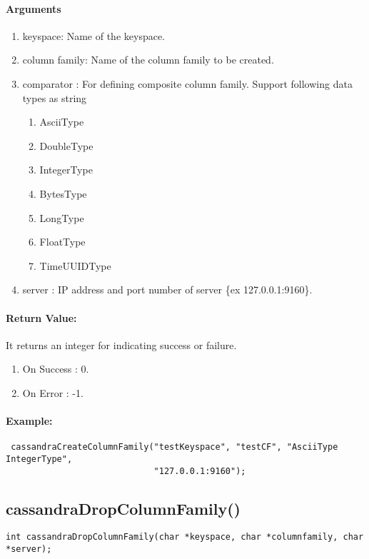 \documentclass[12 pt , a4paper ]{report}
\begin{document}
  \paragraph{Arguments}
  \begin{enumerate}
   \item keyspace: Name of the keyspace.
   \item column family: Name of the column family to be created.
   \item comparator : For defining composite column family. Support following data types as string
		    \begin{enumerate}
		     \item AsciiType
		     \item DoubleType
		     \item IntegerType
		     \item BytesType
		     \item LongType
		     \item FloatType
		     \item TimeUUIDType
		    \end{enumerate}

   \item server : IP address and port number of server \{ex 127.0.0.1:9160\}.
  \end{enumerate}

 \paragraph{Return Value:}
 It returns an integer  for indicating success or failure.
\begin{enumerate}
 \item On Success : 0.
 \item On Error   : -1.
\end{enumerate}
\paragraph{Example:}
\begin{verbatim}
 cassandraCreateColumnFamily("testKeyspace", "testCF", "AsciiType IntegerType", 
                             "127.0.0.1:9160");
\end{verbatim}


\subsection{cassandraDropColumnFamily()}
\begin{verbatim}
int cassandraDropColumnFamily(char *keyspace, char *columnfamily, char *server);
\end{verbatim}
\end{document}
